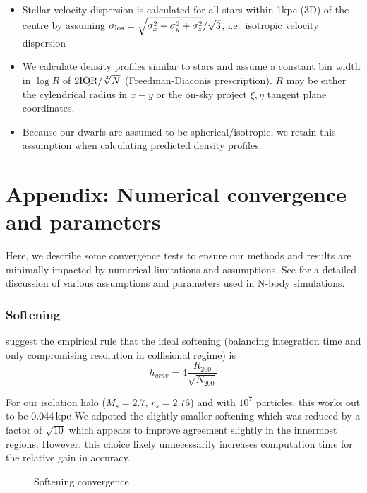 \begin{itemize}
\tightlist
\item
  Stellar velocity dispersion is calculated for all stars within 1kpc
  (3D) of the centre by assuming
  \(\sigma_{\rm los} = \sqrt{\sigma_x^2 + \sigma_y^2 + \sigma_z^2}/ \sqrt 3\),
  i.e.~isotropic velocity dispersion
\item
  We calculate density profiles similar to stars and assume a constant
  bin width in \(\log R\) of \(2 {\rm IQR} / \sqrt[3]{N}\)
  (Freedman-Diaconis prescription). \(R\) may be either the cylendrical
  radius in \(x-y\) or the on-sky project \(\xi, \eta\) tangent plane
  coordinates.
\item
  Because our dwarfs are assumed to be spherical/isotropic, we retain
  this assumption when calculating predicted density profiles.
\end{itemize}

\section{Appendix: Numerical convergence and
parameters}\label{appendix-numerical-convergence-and-parameters}

Here, we describe some convergence tests to ensure our methods and
results are minimally impacted by numerical limitations and assumptions.
See \citet{power+2003} for a detailed discussion of various assumptions
and parameters used in N-body simulations.

\subsubsection{Softening}\label{softening}

\citet{power+2003} suggest the empirical rule that the ideal softening
(balancing integration time and only compromising resolution in
collisional regime) is \begin{equation}{
h_{grav} = 4 \frac{R_{200}}{\sqrt{N_{200}}}
}\end{equation}

For our isolation halo (\(M_s=2.7\), \(r_s=2.76\)) and with \(10^7\)
particles, this works out to be \(0.044\,{\rm kpc}\).We adpoted the
slightly smaller softening which was reduced by a factor of
\(\sqrt{10}\) which appears to improve agreement slightly in the
innermost regions. However, this choice likely unnecessarily increases
computation time for the relative gain in accuracy.

\begin{figure}
\centering
{}
\caption{Softening convergence}\label{fig:softening_convergence}
\end{figure}

